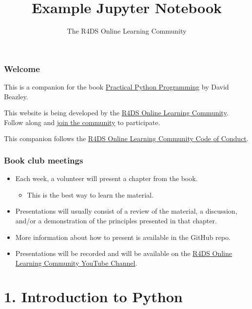 \documentclass[
  letterpaper,
  DIV=11,
  numbers=noendperiod]{scrreprt}
\title{Example Jupyter Notebook}
\subtitle{The R4DS Online Learning Community}
\author{}
\date{}
\providecommand{\tightlist}{%
  \setlength{\itemsep}{0pt}\setlength{\parskip}{0pt}}
\renewcommand*\contentsname{Table of contents}
\begin{document}
\maketitle

\renewcommand*\contentsname{Table of contents}
{
\hypersetup{linkcolor=}
\setcounter{tocdepth}{2}
\tableofcontents
}
\hypertarget{welcome}{%
\section*{Welcome}\label{welcome}}

This is a companion for the book
\href{https://dabeaz-course.github.io/practical-python/}{Practical
Python Programming} by David Beazley.

This website is being developed by the
\href{https://rfordatasci.com/}{R4DS Online Learning Community}. Follow
along and \href{https://r4ds.io/join}{join the community} to
participate.

This companion follows the \href{https://r4ds.io/conduct}{R4DS Online
Learning Community Code of Conduct}.

\hypertarget{book-club-meetings}{%
\section*{Book club meetings}\label{book-club-meetings}}

\begin{itemize}
\item
  Each week, a volunteer will present a chapter from the book.

  \begin{itemize}
  \tightlist
  \item
    This is the best way to learn the material.
  \end{itemize}
\item
  Presentations will usually consist of a review of the material, a
  discussion, and/or a demonstration of the principles presented in that
  chapter.
\item
  More information about how to present is available in the GitHub repo.
\item
  Presentations will be recorded and will be available on the
  \href{https://r4ds.io/youtube}{R4DS Online Learning Community YouTube
  Channel}.
\end{itemize}

\part{1. Introduction to Python}
\end{document}
